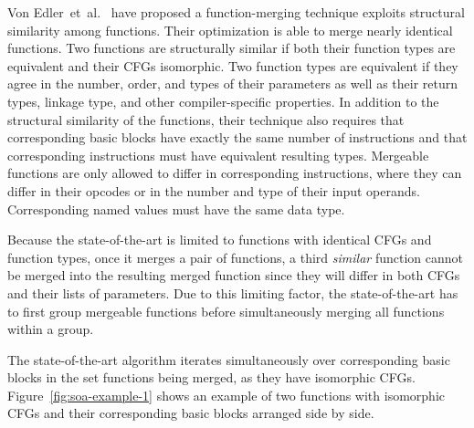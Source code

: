 Von Edler~et~al.~\cite{edler14} have proposed a function-merging technique exploits structural similarity among functions.
Their optimization is able to merge nearly identical functions.
Two functions are structurally similar if both their function types are equivalent
and their CFGs isomorphic.
Two function types are equivalent if they agree in the number, order, and types
of their parameters as well as
their return types, linkage type, and other compiler-specific properties.
In addition to the structural similarity of the functions, their technique also
requires that corresponding basic blocks have exactly the same number of instructions
and that corresponding instructions must have equivalent resulting types.
Mergeable functions are only allowed to differ in corresponding instructions,
where they can differ in their opcodes or in the number and type of their input operands.
Corresponding named values must have the same data type.



Because the state-of-the-art is limited to functions with identical CFGs
and function types, once it merges a pair of functions, a third
\textit{similar} function cannot be merged into the resulting merged function
since they will differ in both CFGs and their lists of parameters.
Due to this limiting factor, the state-of-the-art has to first group
mergeable functions before simultaneously merging all functions within a group.

The state-of-the-art algorithm iterates simultaneously over corresponding basic
blocks in the set functions being merged, as they have isomorphic CFGs.
Figure~\ref{fig:soa-example-1} shows an example of two functions with isomorphic CFGs and their corresponding basic blocks arranged side by side.

